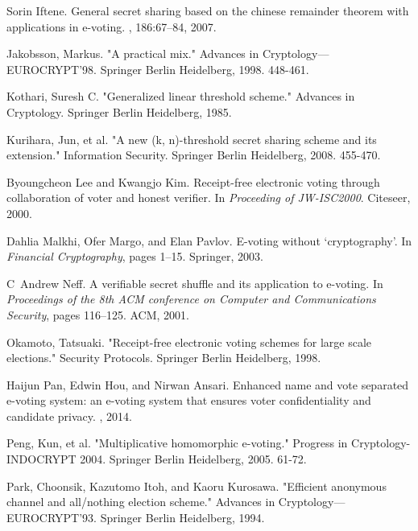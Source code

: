 \documentclass[conference]{IEEEtran}
\begin{document}
\begin{thebibliography}{50}
Sorin Iftene.
\newblock General secret sharing based on the chinese remainder theorem with
applications in e-voting.
, 186:67--84,
2007.

Jakobsson, Markus. "A practical mix." Advances in Cryptology—EUROCRYPT'98. Springer Berlin Heidelberg, 1998. 448-461.


Kothari, Suresh C. "Generalized linear threshold scheme." Advances in Cryptology. Springer Berlin Heidelberg, 1985.


Kurihara, Jun, et al. "A new (k, n)-threshold secret sharing scheme and its extension." Information Security. Springer Berlin Heidelberg, 2008. 455-470.


Byoungcheon Lee and Kwangjo Kim.
\newblock Receipt-free electronic voting through collaboration of voter and
honest verifier.
\newblock In {\em Proceeding of JW-ISC2000}. Citeseer, 2000.

Dahlia Malkhi, Ofer Margo, and Elan Pavlov.
\newblock E-voting without ‘cryptography’.
\newblock In {\em Financial Cryptography}, pages 1--15. Springer, 2003.

C~Andrew Neff.
\newblock A verifiable secret shuffle and its application to e-voting.
\newblock In {\em Proceedings of the 8th ACM conference on Computer and
	Communications Security}, pages 116--125. ACM, 2001.

Okamoto, Tatsuaki. "Receipt-free electronic voting schemes for large scale elections." Security Protocols. Springer Berlin Heidelberg, 1998.

Haijun Pan, Edwin Hou, and Nirwan Ansari.
\newblock Enhanced name and vote separated e-voting system: an e-voting system
that ensures voter confidentiality and candidate privacy.
, 2014.

Peng, Kun, et al. "Multiplicative homomorphic e-voting." Progress in Cryptology-INDOCRYPT 2004. Springer Berlin Heidelberg, 2005. 61-72.

Park, Choonsik, Kazutomo Itoh, and Kaoru Kurosawa. "Efficient anonymous channel and all/nothing election scheme." Advances in Cryptology—EUROCRYPT’93. Springer Berlin Heidelberg, 1994.



\end{thebibliography}
\end{document}
